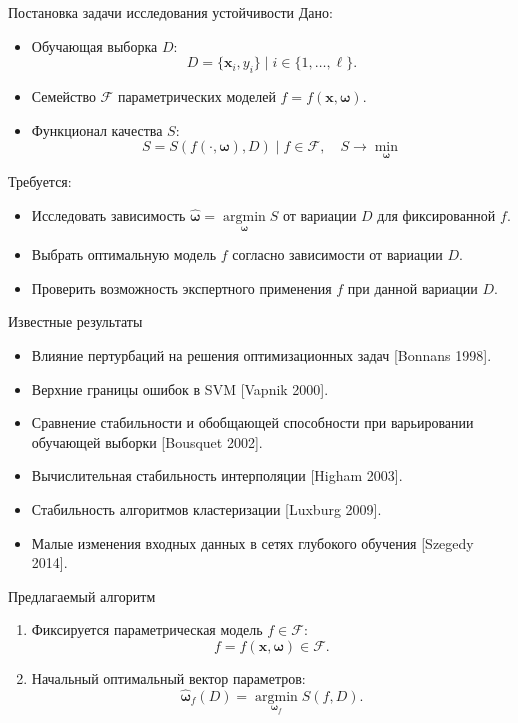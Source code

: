 \documentclass{beamer}
\begin{document}
\begin{frame}{Постановка задачи исследования устойчивости}
  Дано:
  \begin{itemize}
   \item Обучающая выборка $D$:
     \[
	   D = \{ \mathbf{x}_i, y_i \} \mid i \in \{ 1, \dots, \ell \}.
     \]
   \item Семейство $\mathcal{F}$ параметрических моделей $f = f(\mathbf{x}, \boldsymbol{\omega})$.
   \item Функционал качества $S$:
     \[
       S = S (f (\cdot, \boldsymbol{\omega}), D) \mid f \in \mathcal{F}, \quad S \rightarrow \mathop{\min}\limits_{\boldsymbol{\omega}}
     \]
  \end{itemize}
  
  Требуется:
  \begin{itemize}
    \item Исследовать зависимость $\hat{\boldsymbol{\omega}} = \mathop{\arg \min}\limits_{\boldsymbol{\omega}} S$ от вариации $D$ для фиксированной $f$.
    \item Выбрать оптимальную модель $f$ согласно зависимости от вариации $D$.
    \item Проверить возможность экспертного применения $f$ при данной вариации $D$.
  \end{itemize}
\end{frame}

\begin{frame}{Известные результаты}
  \begin{itemize}
    \item Влияние пертурбаций на решения оптимизационных задач [Bonnans 1998].
    \item Верхние границы ошибок в SVM [Vapnik 2000].
    \item Сравнение стабильности и обобщающей способности при варьировании обучающей выборки [Bousquet 2002].
    \item Вычислительная стабильность интерполяции [Higham 2003].
    \item Стабильность алгоритмов кластеризации [Luxburg 2009].
    \item Малые изменения входных данных в сетях глубокого обучения [Szegedy 2014].
  \end{itemize}
\end{frame}

\begin{frame}{Предлагаемый алгоритм}
  \begin{enumerate}
    \item Фиксируется параметрическая модель $f \in \mathcal{F}$:
      \[
        f = f(\mathbf{x}, \boldsymbol{\omega}) \in \mathcal{F}.
      \]
    \item Начальный оптимальный вектор параметров:
      \[
        \hat{\boldsymbol{\omega}}_f(D) = \mathop{\arg \min}\limits_{\boldsymbol{\omega}_f} S(f, D).
      \]
  \end{enumerate}
\end{frame}
\end{document}
